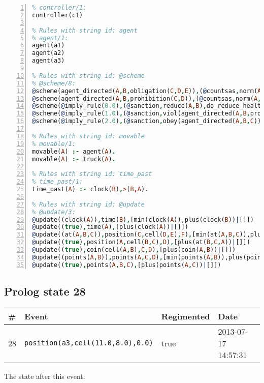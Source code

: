 \documentclass[11pt]{article}\usepackage[utf8]{inputenc}\usepackage{geometry}
\begin{document}
\begin{lstlisting}[language=Prolog, numbers=left]
% Rules with string id: controller
% controller/1:
controller(c1)

% Rules with string id: agent
% agent/1:
agent(a1)
agent(a2)
agent(a3)

% Rules with string id: @scheme
% @scheme/8:
@scheme(agent_directed(A,B,obligation(C,D,E)),(@countsas,norm(A,B,F,obligation(C,D,E)),F),false,(listTrue(C)),(time_past(D)),false,[plus(viol(agent_directed(A,B,obligation(C,D,E))))|[]],[plus(obey(agent_directed(A,B,obligation(C,D,E))))|[]])
@scheme(agent_directed(A,B,prohibition(C,D)),(@countsas,norm(A,B,E,prohibition(C,D)),E),(listTrue(C)),false,(false),false,[plus(viol(agent_directed(A,B,prohibition(C,D))))|[]],[plus(obey(agent_directed(A,B,prohibition(C,D))))|[]])
@scheme(@imply_rule(0.0),(@sanction,reduce(A,B),do_reduce_health(A,B),notifyAgent(A,changed(status))),true,false,false,false,[min(reduce(A,B))|[]],[])
@scheme(@imply_rule(1.0),(@sanction,viol(agent_directed(A,B,prohibition(C,D))),do_sanction(D)),true,false,false,false,[min(viol(agent_directed(A,B,prohibition(C,D))))|[]],[])
@scheme(@imply_rule(2.0),(@sanction,obey(agent_directed(A,B,C))),true,false,false,false,[min(obey(agent_directed(A,B,C)))|[]],[])

% Rules with string id: movable
% movable/1:
movable(A) :- agent(A).
movable(A) :- truck(A).

% Rules with string id: time_past
% time_past/1:
time_past(A) :- clock(B),>(B,A).

% Rules with string id: @update
% @update/3:
@update((clock(A)),time(B),[min(clock(A)),plus(clock(B))|[]])
@update((true),time(A),[plus(clock(A))|[]])
@update((at(A,B,C)),position(C,cell(D,E),F),[min(at(A,B,C)),plus(at(D,E,C))|[]])
@update((true),position(A,cell(B,C),D),[plus(at(B,C,A))|[]])
@update((true),coin(cell(A,B),C,D),[plus(coin(A,B))|[]])
@update((points(A,B)),points(A,C,D),[min(points(A,B)),plus(points(A,D))|[]])
@update((true),points(A,B,C),[plus(points(A,C))|[]])

\end{lstlisting}
\clearpage 
\subsection{Prolog state 28}
\begin{table}[ht]
\centering 
\begin{tabular}{l l l l} 
\textbf{\#} & \textbf{Event} & \textbf{Regimented} & \textbf{Date} \\ [0.5ex] 
\hline
28&\texttt{position(a3,cell(11.0,8.0),0.0)}&true&2013-07-17 14:57:31\\ [1ex] \hline\end{tabular}
\end{table}
The state after this event:
\end{document}
